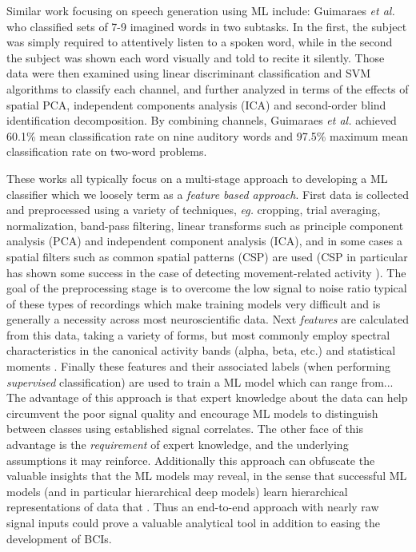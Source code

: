 \documentclass[utf8]{frontiersSCNS} %
\begin{document}
Similar work focusing on speech generation using ML include: Guimaraes {\em et al.} \cite{Guimaraes2007} who classified sets of 7-9 imagined words in two subtasks. In the first, the subject was simply required to attentively listen to a spoken word, while in the second the subject was shown each word visually and told to recite it silently. Those data were then examined using linear discriminant classification and SVM algorithms to classify each channel, and further analyzed in terms of the effects of spatial PCA, independent components analysis (ICA) and second-order blind identification decomposition. By combining channels, Guimaraes {\em et al.} achieved 60.1\% mean classification rate on nine auditory words and 97.5\% maximum mean classification rate on two-word problems.

These works all typically focus on a multi-stage approach to developing a ML classifier which we loosely term as a \emph{feature based approach}. First data is collected and preprocessed using a variety of techniques, \emph{eg.} cropping, trial averaging, normalization, band-pass filtering, linear transforms such as principle component analysis (PCA) and independent component analysis (ICA), and in some cases a spatial filters such as common spatial patterns (CSP) are used (CSP in particular has shown some success in the case of detecting movement-related activity \cite{Schirrmeister2017}). The goal of the preprocessing stage is to overcome the low signal to noise ratio typical of these types of recordings which make training models very difficult and is generally a necessity across most neuroscientific data. Next \emph{features} are calculated from this data, taking a variety of forms, but most commonly employ spectral characteristics in the canonical activity bands (alpha, beta, etc.)\cite{} and statistical moments \cite{}. Finally these features and their associated labels (when performing \emph{supervised} classification) are used to train a ML model which can range from... The advantage of this approach is that expert knowledge about the data can help circumvent the poor signal quality and encourage ML models to distinguish between classes using established signal correlates. The other face of this advantage is the \emph{requirement} of expert knowledge, and the underlying assumptions it may reinforce. Additionally this approach can obfuscate the valuable insights that the ML models may reveal, in the sense that successful ML models (and in particular hierarchical deep models) learn hierarchical representations of data that . Thus an end-to-end approach with nearly raw signal inputs could prove a valuable analytical tool in addition to easing the development of BCIs.
\end{document}
